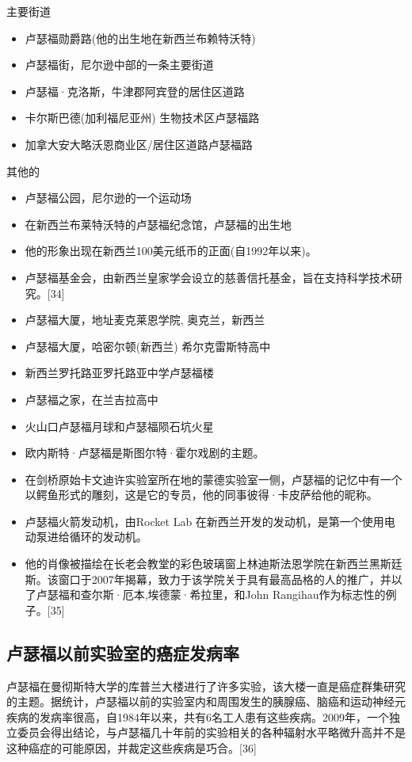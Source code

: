 主要街道
\begin{itemize}
\item 卢瑟福勋爵路(他的出生地在新西兰布赖特沃特)
\item 卢瑟福街，尼尔逊中部的一条主要街道
\item 卢瑟福·克洛斯，牛津郡阿宾登的居住区道路
\item 卡尔斯巴德(加利福尼亚州) 生物技术区卢瑟福路
\item 加拿大安大略沃恩商业区/居住区道路卢瑟福路
\end{itemize}
其他的
\begin{itemize}
\item 卢瑟福公园，尼尔逊的一个运动场
\item 在新西兰布莱特沃特的卢瑟福纪念馆，卢瑟福的出生地
\item 他的形象出现在新西兰100美元纸币的正面(自1992年以来)。
\item 卢瑟福基金会，由新西兰皇家学会设立的慈善信托基金，旨在支持科学技术研究。[34]
\item 卢瑟福大厦，地址麦克莱恩学院, 奥克兰，新西兰
\item 卢瑟福大厦，哈密尔顿(新西兰) 希尔克雷斯特高中
\item 新西兰罗托路亚罗托路亚中学卢瑟福楼
\item 卢瑟福之家，在兰吉拉高中
\item 火山口卢瑟福月球和卢瑟福陨石坑火星
\item 欧内斯特·卢瑟福是斯图尔特·霍尔戏剧的主题。
\item 在剑桥原始卡文迪许实验室所在地的蒙德实验室一侧，卢瑟福的记忆中有一个以鳄鱼形式的雕刻，这是它的专员，他的同事彼得·卡皮萨给他的昵称。
\item 卢瑟福火箭发动机，由Rocket Lab 在新西兰开发的发动机，是第一个使用电动泵进给循环的发动机。
\item 他的肖像被描绘在长老会教堂的彩色玻璃窗上林迪斯法恩学院在新西兰黑斯廷斯。该窗口于2007年揭幕，致力于该学院关于具有最高品格的人的推广，并以了卢瑟福和查尔斯·厄本,埃德蒙·希拉里，和John Rangihau作为标志性的例子。[35]
\end{itemize}

\subsection{卢瑟福以前实验室的癌症发病率}
卢瑟福在曼彻斯特大学的库普兰大楼进行了许多实验，该大楼一直是癌症群集研究的主题。据统计，卢瑟福以前的实验室内和周围发生的胰腺癌、脑癌和运动神经元疾病的发病率很高，自1984年以来，共有6名工人患有这些疾病。2009年，一个独立委员会得出结论，与卢瑟福几十年前的实验相关的各种辐射水平略微升高并不是这种癌症的可能原因，并裁定这些疾病是巧合。[36]

